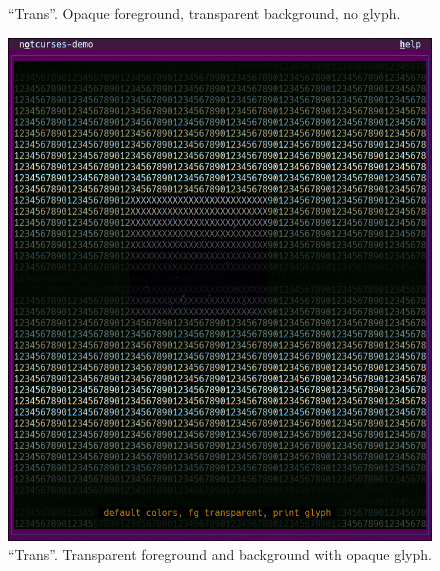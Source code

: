 \documentclass[letterpaper,10pt]{article}
\begin{document}
\begin{figure}
\begin{minipage}{0.30\textwidth}
    \caption[``Trans'', middle phase.]{``Trans''. Opaque foreground, transparent background, no glyph.}
  \end{minipage}\hfill
  \begin{minipage}{0.30\textwidth}
    \includegraphics[width=1\linewidth]{media/demo-trans3.png}
    \caption[``Trans'', late phase.]{``Trans''. Transparent foreground and background with opaque glyph.}
  \end{minipage}\hfill
\end{figure}
\end{document}
